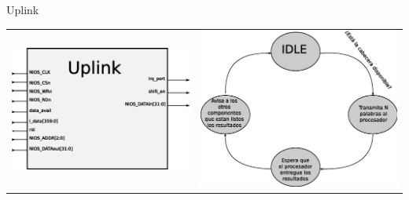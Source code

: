 \documentclass[xcolor=dvipsnames]{beamer}
\begin{document}
\begin{frame}{Uplink}
 \begin{tabularx}{\linewidth}{Z|Z}
    \includegraphics[scale=0.40]{figures/bloquplink.eps} 
    &
    \includegraphics[scale=0.35]{figures/estuplink.eps}
    \\
  \end{tabularx}
\end{frame}
\end{document}
